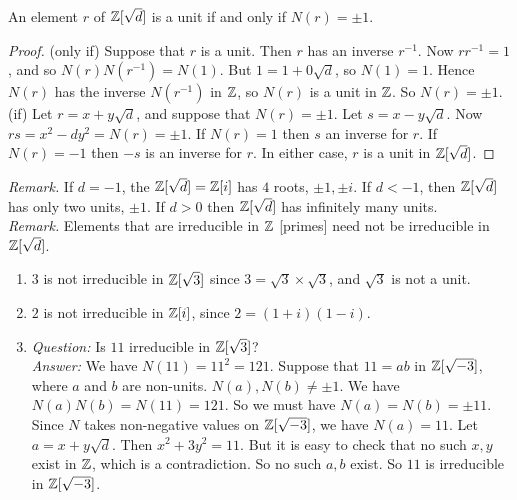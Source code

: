 \documentclass[10pt]{scrartcl}
\begin{document}
\begin{proposition} An   
 element $r$ of $\mathbb{Z}[\sqrt{d}]$ is a unit if and only if $N(r) = \pm 1$. \end{proposition}
\begin{proof}
(only if) Suppose that $r$ is a unit. Then $r$ has an inverse $r^{-1}$. Now $rr^{-1} = 1$, and so $N(r)N(r^{-1}) = N(1)$. But $1 = 1 + 0 \sqrt{d}$, so $N(1) = 1$. Hence $N(r)$ has the inverse $N(r^{-1})$ in $\mathbb{Z}$, so $N(r)$ is a unit in $\mathbb{Z}$. So $N(r) = \pm 1$. \\

(if) Let $r = x + y\sqrt{d}$, and suppose that $N(r) = \pm 1$. Let $s = x - y\sqrt{d}$. Now $rs = x^2 - dy^2 = N(r) = \pm 1$. If $N(r) = 1$ then $s$ an inverse for $r$. If $N(r) = -1$  then $-s$ is an inverse for $r$. In either case, $r$ is a unit in $\mathbb{Z}[\sqrt{d}]$.
\end{proof}\vspace*{5pt}

 \textit{Remark.} If $d = -1$, the $\mathbb{Z}[\sqrt{d}] = \mathbb{Z}[i]$ has $4$ roots, $\pm 1, \pm i$. If $d < -1$, then $\mathbb{Z}[\sqrt{d}]$ has only two units, $\pm 1$. If $d > 0$ then $\mathbb{Z}[\sqrt{d}]$ has infinitely many units.\\

 \textit{Remark.} Elements that are irreducible in $\mathbb{Z}$ [primes] need not be irreducible in $\mathbb{Z}[\sqrt{d}]$.\\

\begin{examples} \begin{enumerate}
 \item $3$ is not irreducible in $\mathbb{Z}[\sqrt{3}]$ since $3 = \sqrt{3} \times \sqrt{3}$, and $\sqrt{3}$ is not a unit.
 \item $2$ is not irreducible in $\mathbb{Z}[i]$, since $2 = (1+i)(1-i)$. 
 \item \textit{Question:} Is $11$ irreducible in $\mathbb{Z}[\sqrt{3}]$?\vspace*{5pt}\\
\textit{Answer:} We have $N(11) = 11^2 = 121$. Suppose that $11 = ab$ in $\mathbb{Z}[\sqrt{-3}]$, where $a$ and $b$ are non-units. $N(a), N(b) \neq \pm 1$. We have $N(a)N(b) = N(11) = 121$. So we must have $N(a) = N(b) = \pm 11$. Since $N$ takes non-negative values on $\mathbb{Z}[\sqrt{-3}]$, we have $N(a) = 11$. Let $a = x + y\sqrt{d}$. Then $x^2 + 3y^2 = 11$. But it is easy to check that no such $x,y$ exist in $\mathbb{Z}$, which is a contradiction. So no such $a,b$ exist. So $11$ is irreducible in $\mathbb{Z}[\sqrt{-3}]$. %
 \end{enumerate}\end{examples}
 
\end{document}
